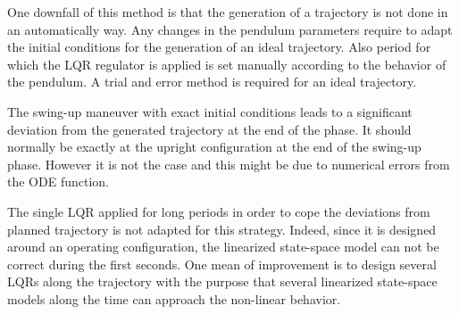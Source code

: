 \documentclass[a4paper,12pt]{article}
\begin{document}
One downfall of this method is that the generation of a trajectory is not done in an automatically way. Any changes in the pendulum parameters require to adapt the initial conditions for the generation of an ideal trajectory. Also period for which the LQR regulator is applied is set manually according to the behavior of the pendulum. A trial and error method is required for an ideal trajectory.

The swing-up maneuver with exact initial conditions leads to a significant deviation from the generated trajectory at the end of the phase. It should normally be exactly at the upright configuration at the end of the swing-up phase. However it is not the case and this might be due to numerical errors from the ODE function.

The single LQR applied for long periods in order to cope the deviations from planned trajectory is not adapted for this strategy. Indeed, since it is designed around an operating configuration, the linearized state-space model can not be correct during the first seconds. One mean of improvement is to design several LQRs along the trajectory with the purpose that several linearized state-space models along the time can approach the non-linear behavior.

\newpage
\appendix
\end{document}
